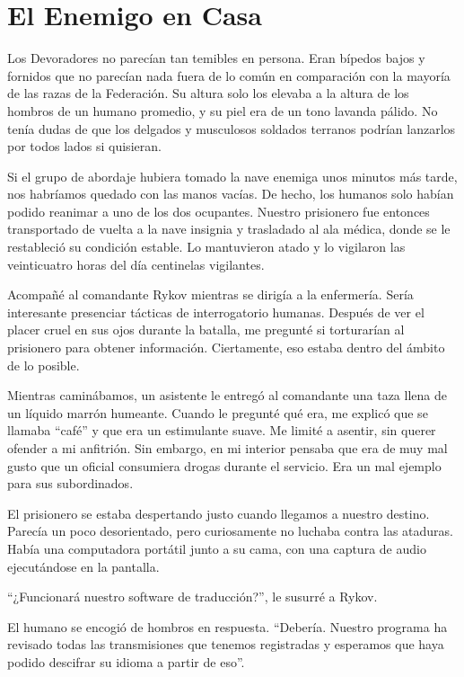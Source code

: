 \chapter{El Enemigo en Casa}\label{sec:el-enemigo-en-casa}

Los Devoradores no parecían tan temibles en persona. Eran bípedos bajos y fornidos que no parecían nada fuera de lo común en comparación con la mayoría de las razas de la Federación. Su altura solo los elevaba a la altura de los hombros de un humano promedio, y su piel era de un tono lavanda pálido. No tenía dudas de que los delgados y musculosos soldados terranos podrían lanzarlos por todos lados si quisieran.

Si el grupo de abordaje hubiera tomado la nave enemiga unos minutos más tarde, nos habríamos quedado con las manos vacías. De hecho, los humanos solo habían podido reanimar a uno de los dos ocupantes. Nuestro prisionero fue entonces transportado de vuelta a la nave insignia y trasladado al ala médica, donde se le restableció su condición estable. Lo mantuvieron atado y lo vigilaron las veinticuatro horas del día centinelas vigilantes.

Acompañé al comandante Rykov mientras se dirigía a la enfermería. Sería interesante presenciar tácticas de interrogatorio humanas. Después de ver el placer cruel en sus ojos durante la batalla, me pregunté si torturarían al prisionero para obtener información. Ciertamente, eso estaba dentro del ámbito de lo posible.

Mientras caminábamos, un asistente le entregó al comandante una taza llena de un líquido marrón humeante. Cuando le pregunté qué era, me explicó que se llamaba “café” y que era un estimulante suave. Me limité a asentir, sin querer ofender a mi anfitrión. Sin embargo, en mi interior pensaba que era de muy mal gusto que un oficial consumiera drogas durante el servicio. Era un mal ejemplo para sus subordinados.

El prisionero se estaba despertando justo cuando llegamos a nuestro destino. Parecía un poco desorientado, pero curiosamente no luchaba contra las ataduras. Había una computadora portátil junto a su cama, con una captura de audio ejecutándose en la pantalla.

“¿Funcionará nuestro software de traducción?”, le susurré a Rykov.

El humano se encogió de hombros en respuesta. “Debería. Nuestro programa ha revisado todas las transmisiones que tenemos registradas y esperamos que haya podido descifrar su idioma a partir de eso”.

